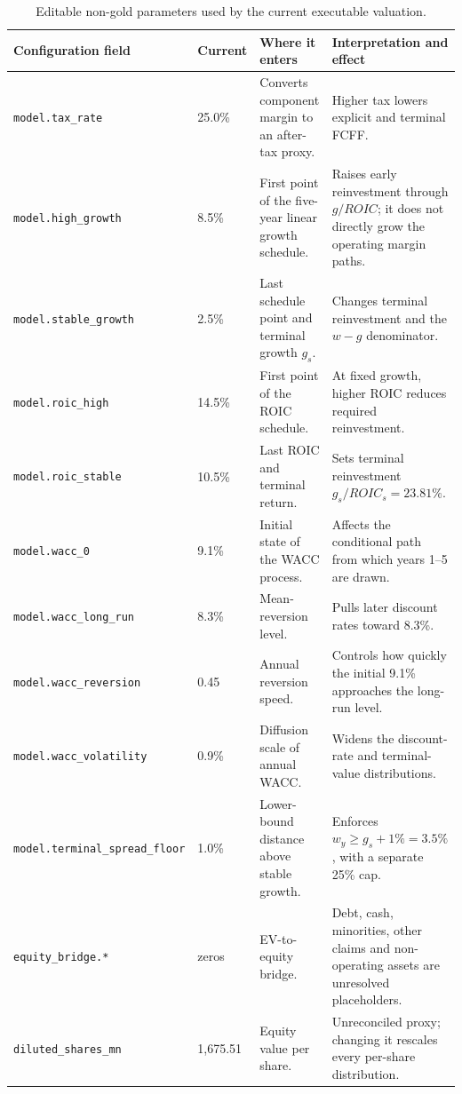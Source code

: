 \begin{table}[H]
\centering
\caption{Editable non-gold parameters used by the current executable valuation.}
\label{tab:current-editable-valuation-parameters}
\scriptsize
\setlength{\tabcolsep}{3pt}
\renewcommand{\arraystretch}{1.10}
\begin{tabularx}{\textwidth}{@{}p{3.15cm}p{1.35cm}X X@{}}
\toprule
Configuration field & Current & Where it enters & Interpretation and effect \\
\midrule
\texttt{model.tax\_rate} & 25.0\% & Converts component margin to an
after-tax proxy. & Higher tax lowers explicit and terminal FCFF. \\
\texttt{model.high\_growth} & 8.5\% & First point of the five-year linear
growth schedule. & Raises early reinvestment through \(g/ROIC\); it does not
directly grow the operating margin paths. \\
\texttt{model.stable\_growth} & 2.5\% & Last schedule point and terminal
growth \(g_s\). & Changes terminal reinvestment and the \(w-g\) denominator. \\
\texttt{model.roic\_high} & 14.5\% & First point of the ROIC schedule. & At
fixed growth, higher ROIC reduces required reinvestment. \\
\texttt{model.roic\_stable} & 10.5\% & Last ROIC and terminal return. & Sets
terminal reinvestment \(g_s/ROIC_s=23.81\%\). \\
\texttt{model.wacc\_0} & 9.1\% & Initial state of the WACC process. & Affects
the conditional path from which years 1--5 are drawn. \\
\texttt{model.wacc\_long\_run} & 8.3\% & Mean-reversion level. & Pulls later
discount rates toward 8.3\%. \\
\texttt{model.wacc\_reversion} & 0.45 & Annual reversion speed. & Controls how
quickly the initial 9.1\% approaches the long-run level. \\
\texttt{model.wacc\_volatility} & 0.9\% & Diffusion scale of annual WACC. &
Widens the discount-rate and terminal-value distributions. \\
\texttt{model.terminal\_}\newline\texttt{spread\_floor} & 1.0\% & Lower-bound distance above
stable growth. & Enforces \(w_y\geq g_s+1\%=3.5\%\), with a separate 25\% cap. \\
\texttt{equity\_bridge.*} & zeros & EV-to-equity bridge. & Debt, cash,
minorities, other claims and non-operating assets are unresolved placeholders. \\
\texttt{diluted\_shares\_mn} & 1,675.51 & Equity value per share. & Unreconciled
proxy; changing it rescales every per-share distribution. \\
\bottomrule
\end{tabularx}
\end{table}

